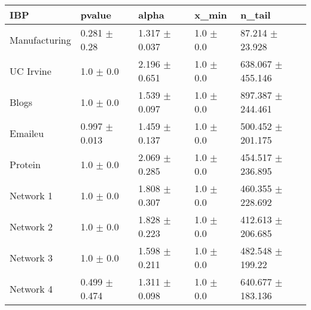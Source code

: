 \begin{tabular}{@{}lllll@{}}
\toprule

\textbf{IBP} & pvalue & alpha & x\_min & n\_tail \\\midrule

Manufacturing & 0.281 \(\pm\) 0.28 & 1.317 \(\pm\) 0.037 & 1.0 \(\pm\)
0.0 & 87.214 \(\pm\) 23.928 \\
UC Irvine & 1.0 \(\pm\) 0.0 & 2.196 \(\pm\) 0.651 & 1.0 \(\pm\)
0.0 & 638.067 \(\pm\) 455.146 \\
Blogs & 1.0 \(\pm\) 0.0 & 1.539 \(\pm\) 0.097 & 1.0 \(\pm\)
0.0 & 897.387 \(\pm\) 244.461 \\
Emaileu & 0.997 \(\pm\) 0.013 & 1.459 \(\pm\) 0.137 & 1.0 \(\pm\)
0.0 & 500.452 \(\pm\) 201.175 \\
Protein & 1.0 \(\pm\) 0.0 & 2.069 \(\pm\) 0.285 & 1.0 \(\pm\)
0.0 & 454.517 \(\pm\) 236.895 \\
Network 1 & 1.0 \(\pm\) 0.0 & 1.808 \(\pm\) 0.307 & 1.0 \(\pm\)
0.0 & 460.355 \(\pm\) 228.692 \\
Network 2 & 1.0 \(\pm\) 0.0 & 1.828 \(\pm\) 0.223 & 1.0 \(\pm\)
0.0 & 412.613 \(\pm\) 206.685 \\
Network 3 & 1.0 \(\pm\) 0.0 & 1.598 \(\pm\) 0.211 & 1.0 \(\pm\)
0.0 & 482.548 \(\pm\) 199.22 \\
Network 4 & 0.499 \(\pm\) 0.474 & 1.311 \(\pm\) 0.098 & 1.0 \(\pm\)
0.0 & 640.677 \(\pm\) 183.136 \\

\bottomrule
\end{tabular}
